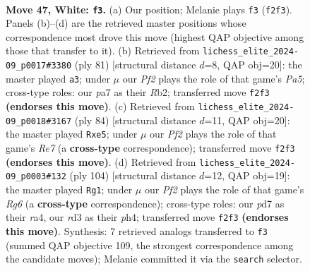 \documentclass[11pt]{article}
\begin{document}
\clearpage

\begin{figure}[p]\centering
\begin{subfigure}{0.46\textwidth}\centering
\resizebox{\linewidth}{!}{%
\newchessgame
\chessboard[
  setfen={8/p2p4/2p5/4K2k/7P/3r4/5P2/8 w - - 1 47},
  showmover=false,
  pgfstyle=straightmove, color=movearrow, markmove={f2-f3}
]}
\caption{}
\end{subfigure}\hfill
\begin{subfigure}{0.46\textwidth}\centering
\resizebox{\linewidth}{!}{%
\newchessgame
\chessboard[
  setfen={8/4k3/2R3P1/4p3/p3K3/2P5/1r6/8 b - - 0 41},
  showmover=false,
  pgfstyle=straightmove, color=movearrow, markmove={a4-a3}
]}
\caption{}
\end{subfigure}
\\[4pt]
\begin{subfigure}{0.46\textwidth}\centering
\resizebox{\linewidth}{!}{%
\newchessgame
\chessboard[
  setfen={8/4R3/8/p3p3/6kP/4K3/r7/8 w - - 0 43},
  showmover=false,
  pgfstyle=straightmove, color=movearrow, markmove={e7-e5}
]}
\caption{}
\end{subfigure}\hfill
\begin{subfigure}{0.46\textwidth}\centering
\resizebox{\linewidth}{!}{%
\newchessgame
\chessboard[
  setfen={8/8/6R1/8/r6p/p3kP1K/8/8 w - - 1 53},
  showmover=false,
  pgfstyle=straightmove, color=movearrow, markmove={g6-g1}
]}
\caption{}
\end{subfigure}
\caption{\textbf{Move 47, White: \texttt{f3}.} (a) Our position; Melanie plays \texttt{f3} (\texttt{f2f3}). Panels (b)--(d) are the retrieved master positions whose correspondence most drove this move (highest QAP objective among those that transfer to it). (b) Retrieved from \texttt{lichess\_elite\_2024-09\_p0017\#3380} (ply 81) [structural distance $d$=8, QAP obj=20]: the master played \texttt{a3}; under $\mu$ our \emph{Pf2} plays the role of that game's \emph{Pa5}; cross-type roles: our \emph{p}a7 as their \emph{R}b2; transferred move \texttt{f2f3} \textbf{(endorses this move)}. (c) Retrieved from \texttt{lichess\_elite\_2024-09\_p0018\#3167} (ply 84) [structural distance $d$=11, QAP obj=20]: the master played \texttt{Rxe5}; under $\mu$ our \emph{Pf2} plays the role of that game's \emph{Re7} (a \textbf{cross-type} correspondence); transferred move \texttt{f2f3} \textbf{(endorses this move)}. (d) Retrieved from \texttt{lichess\_elite\_2024-09\_p0003\#132} (ply 104) [structural distance $d$=12, QAP obj=19]: the master played \texttt{Rg1}; under $\mu$ our \emph{Pf2} plays the role of that game's \emph{Rg6} (a \textbf{cross-type} correspondence); cross-type roles: our \emph{p}d7 as their \emph{r}a4, our \emph{r}d3 as their \emph{p}h4; transferred move \texttt{f2f3} \textbf{(endorses this move)}. Synthesis: 7 retrieved analogs transferred to \texttt{f3} (summed QAP objective 109, the strongest correspondence among the candidate moves); Melanie committed it via the \texttt{search} selector.}
\label{fig:thought-m92}
\end{figure}
\end{document}
